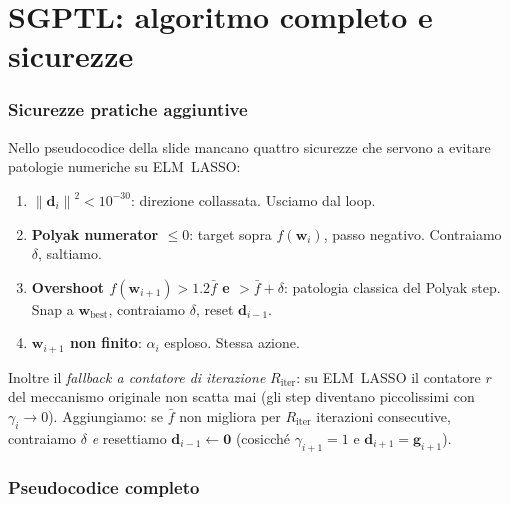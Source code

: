 \documentclass[11pt,a4paper]{article}
\newcommand{\norm}[1]{\left\|#1\right\|}
\newcommand{\bw}{\mathbf{w}}
\newcommand{\bg}{\mathbf{g}}
\newcommand{\bd}{\mathbf{d}}
\newcommand{\bzero}{\mathbf{0}}
\theoremstyle{definition}
\begin{document}
\part{SGPTL: algoritmo completo e sicurezze}

\section{Sicurezze pratiche aggiuntive}
\label{sec:safeguards}

Nello pseudocodice della slide mancano quattro sicurezze che servono a evitare patologie numeriche su ELM~LASSO:

\begin{enumerate}[leftmargin=*]
\item \textbf{$\norm{\bd_i}^2 < 10^{-30}$}: direzione collassata. Usciamo dal loop.
\item \textbf{Polyak numerator $\le 0$}: target sopra $f(\bw_i)$, passo negativo. Contraiamo $\delta$, saltiamo.
\item \textbf{Overshoot $f(\bw_{i+1}) > 1.2\bar f$ e $> \bar f + \delta$}: patologia classica del Polyak step. Snap a $\bw_{\text{best}}$, contraiamo $\delta$, reset $\bd_{i-1}$.
\item \textbf{$\bw_{i+1}$ non finito}: $\alpha_i$ esploso. Stessa azione.
\end{enumerate}

Inoltre il \emph{fallback a contatore di iterazione} $R_{\mathrm{iter}}$: su ELM~LASSO il contatore $r$ del meccanismo originale non scatta mai (gli step diventano piccolissimi con $\gamma_i\to 0$). Aggiungiamo: se $\bar f$ non migliora per $R_{\mathrm{iter}}$ iterazioni consecutive, contraiamo $\delta$ \emph{e} resettiamo $\bd_{i-1}\gets\bzero$ (cosicché $\gamma_{i+1}=1$ e $\bd_{i+1}=\bg_{i+1}$).

\section{Pseudocodice completo}
\end{document}
